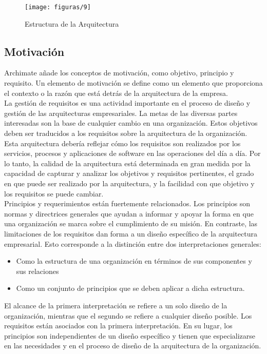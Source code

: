   \begin{figure}[H]
   	\centering
   	\texttt{[image: figuras/9]}
   	\captionsetup{width=.95\textwidth}
   	\caption{Estructura de la Arquitectura}
   	\label{figura9}
  \end{figure}

  \subsection{Motivación}
  Archimate añade los conceptos de motivación, como objetivo, principio y requisito. Un elemento de motivación se define como un elemento que proporciona el contexto o la razón que está detrás de la arquitectura de la empresa. \\
  
  La gestión de requisitos es una actividad importante en el proceso de diseño y gestión de las arquitecturas empresariales. La metas de las diversas partes interesadas son la base de cualquier cambio en una organización. Estos objetivos deben ser traducidos a los requisitos sobre la arquitectura de la organización. Esta arquitectura debería reflejar cómo los requisitos son realizados por los servicios, procesos y aplicaciones de software en las operaciones del día a día. Por lo tanto, la calidad de la arquitectura está determinada en gran medida por la capacidad de capturar y analizar los objetivos y requisitos pertinentes, el grado en que puede ser realizado por la arquitectura, y la facilidad con que objetivo y los requisitos se puede cambiar. \\
  
  Principios y requerimientos están fuertemente relacionados. Los principios son normas y directrices generales que ayudan a informar y apoyar la forma en que una organización se marca sobre el cumplimiento de su misión. En contraste, las limitaciones de los requisitos dan forma a un diseño específico de la arquitectura empresarial. Esto corresponde a la distinción entre dos interpretaciones generales:
  \begin{itemize}
  	\item Como la estructura de una organización en términos de sus componentes y sus relaciones
  	\item Como un conjunto de principios que se deben aplicar a dicha estructura.
  \end{itemize}
  El alcance de la primera interpretación se refiere a un solo diseño de la organización, mientras que el segundo se refiere a cualquier diseño posible. Los requisitos están asociados con la primera interpretación. En su lugar, los principios son independientes de un diseño específico y tienen que especializarse en las necesidades y en el proceso de diseño de la arquitectura de la organización. \\
  
